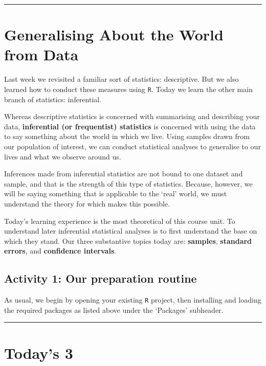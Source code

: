 \documentclass[
]{book}
\begin{document}
\begin{center}\rule{0.5\linewidth}{0.5pt}\end{center}

\hypertarget{generalising-about-the-world-from-data}{%
\section{Generalising About the World from Data}\label{generalising-about-the-world-from-data}}

Last week we revisited a familiar sort of statistics: descriptive. But we also learned how to conduct these measures using \texttt{R}. Today we learn the other main branch of statistics: inferential.

Whereas descriptive statistics is concerned with summarising and describing your data, \textbf{inferential (or frequentist) statistics} is concerned with using the data to say something about the world in which we live. Using samples drawn from our population of interest, we can conduct statistical analyses to generalise to our lives and what we observe around us.

Inferences made from inferential statistics are not bound to one dataset and sample, and that is the strength of this type of statistics. Because, however, we will be saying something that is applicable to the `real' world, we must understand the theory for which makes this possible.

Today's learning experience is the most theoretical of this course unit. To understand later inferential statistical analyses is to first understand the base on which they stand. Our three substantive topics today are: \textbf{samples}, \textbf{standard errors}, and \textbf{confidence intervals}.

\hypertarget{activity-1-our-preparation-routine-1}{%
\subsection{Activity 1: Our preparation routine}\label{activity-1-our-preparation-routine-1}}

As usual, we begin by opening your existing \texttt{R} project, then installing and loading the required packages as listed above under the `Packages' subheader.

\begin{center}\rule{0.5\linewidth}{0.5pt}\end{center}

\hypertarget{todays-3-2}{%
\section{Today's 3}\label{todays-3-2}}
\end{document}
